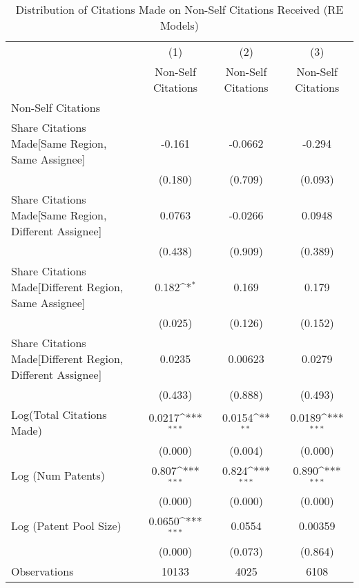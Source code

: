 {
\def\sym#1{\ifmmode^{#1}\else\(^{#1}\)\fi}
\begin{longtable}{l*{3}{c}}
\caption{Distribution of Citations Made on Non-Self Citations Received (RE Models) \label{model222324}}\\
\hline\hline\endfirsthead\hline\endhead\hline\endfoot\endlastfoot
                &\multicolumn{1}{c}{(1)}&\multicolumn{1}{c}{(2)}&\multicolumn{1}{c}{(3)}\\
                &\multicolumn{1}{c}{Non-Self Citations}&\multicolumn{1}{c}{Non-Self Citations}&\multicolumn{1}{c}{Non-Self Citations}\\
\hline
Non-Self Citations&                  &                  &                  \\
Share Citations Made[Same Region, Same Assignee]&   -0.161         &  -0.0662         &   -0.294         \\
                &  (0.180)         &  (0.709)         &  (0.093)         \\
Share Citations Made[Same Region, Different Assignee]&   0.0763         &  -0.0266         &   0.0948         \\
                &  (0.438)         &  (0.909)         &  (0.389)         \\
Share Citations Made[Different Region, Same Assignee]&    0.182\sym{*}  &    0.169         &    0.179         \\
                &  (0.025)         &  (0.126)         &  (0.152)         \\
Share Citations Made[Different Region, Different Assignee]&   0.0235         &  0.00623         &   0.0279         \\
                &  (0.433)         &  (0.888)         &  (0.493)         \\
Log(Total Citations Made)&   0.0217\sym{***}&   0.0154\sym{**} &   0.0189\sym{***}\\
                &  (0.000)         &  (0.004)         &  (0.000)         \\
Log (Num Patents)&    0.807\sym{***}&    0.824\sym{***}&    0.890\sym{***}\\
                &  (0.000)         &  (0.000)         &  (0.000)         \\
Log (Patent Pool Size)&   0.0650\sym{***}&   0.0554         &  0.00359         \\
                &  (0.000)         &  (0.073)         &  (0.864)         \\
\hline
Observations    &    10133         &     4025         &     6108         \\

\end{longtable}}
